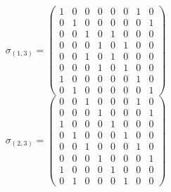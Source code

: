 \documentclass[8pt]{article}\usepackage{amsmath}
\begin{document}
 \[ \sigma_{(1, 3)}= \left(\begin{array}{rrrrrrrr}
1 & 0 & 0 & 0 & 0 & 0 & 1 & 0 \\
0 & 1 & 0 & 0 & 0 & 0 & 0 & 1 \\
0 & 0 & 1 & 0 & 1 & 0 & 0 & 0 \\
0 & 0 & 0 & 1 & 0 & 1 & 0 & 0 \\
0 & 0 & 1 & 0 & 1 & 0 & 0 & 0 \\
0 & 0 & 0 & 1 & 0 & 1 & 0 & 0 \\
1 & 0 & 0 & 0 & 0 & 0 & 1 & 0 \\
0 & 1 & 0 & 0 & 0 & 0 & 0 & 1
\end{array}\right)  \]
 \[ \sigma_{(2, 3)}= \left(\begin{array}{rrrrrrrr}
0 & 0 & 1 & 0 & 0 & 0 & 1 & 0 \\
0 & 0 & 0 & 1 & 0 & 0 & 0 & 1 \\
1 & 0 & 0 & 0 & 1 & 0 & 0 & 0 \\
0 & 1 & 0 & 0 & 0 & 1 & 0 & 0 \\
0 & 0 & 1 & 0 & 0 & 0 & 1 & 0 \\
0 & 0 & 0 & 1 & 0 & 0 & 0 & 1 \\
1 & 0 & 0 & 0 & 1 & 0 & 0 & 0 \\
0 & 1 & 0 & 0 & 0 & 1 & 0 & 0
\end{array}\right)  \]
 
\end{document}
